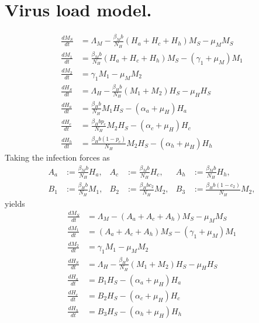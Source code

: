 \section{Virus load model.}
\begin{equation}
	\begin{aligned}
		\frac{dM_S}{dt}&= 
			\Lambda_M - \frac{\beta_Mb}{N_H}
			(H_a+H_c+H_h)M_S-\mu_MM_S
		\\
		\frac{dM_1}{dt}
			&=
			\frac{\beta_Mb}{N_H}
			(H_a + H_c + H_h) M_S 
			-
			(\gamma_1 + \mu_M) M_1
		\\
		\frac{dM_2}{dt}&=
			\gamma_1M_1-\mu_MM_2
		\\
		\frac{dH_S}{dt}&=
			\Lambda_H
			-\frac{\beta_H b}{N_H}(M_1 + M_2)H_S
			-\mu_HH_S
	\\
		\frac{dH_a}{dt}&=
			\frac{\beta_H b}{N_H} M_1 H_S
			-
			(\alpha_a + \mu_H) H_a
	\\
		\frac{dH_c}{dt}&=
			\frac{\beta_H b p_c}{N_H} M_2 H_S
			-(\alpha_c + \mu_H) H_c
	\\
		\frac{dH_h}{dt}&=
			\frac{\beta_H b(1-p_c)}{N_H}
			M_2 H_S
		-
		(\alpha_h + \mu_H) H_h
	\end{aligned}
\end{equation}
Taking the infection forces as
\begin{align*}
	A_a &:= 
		\frac{\beta_Mb}{N_H} H_a, 
	&
	A_c &:=
		\frac{\beta_Mb}{N_H}H_c ,
	&
	A_h &:=
		\frac{\beta_Mb}{N_H}H_h,
	\\
	B_1&:=
		\frac{\beta_Hb}{N_H}M_1,
	&
	B_2&:=
		\frac{\beta_Hbc_2}{N_H}M_2, 
	&
	B_3&:=
		\frac{\beta_Hb(1-c_2)}{N_H}M_2,
\end{align*}
yields
\begin{equation}
	\begin{aligned}
		\frac{dM_S}{dt}
			&= \Lambda_M 
			-(A_a + A_c + A_h) M_S 
			- \mu_M M_S
		\\
		\frac{dM_1}{dt}
			&= (A_a + A_c + A_h) M_S 
			-(\gamma_1 + \mu_M) M_1
		\\
		\frac{dM_2}{dt}
			&=\gamma_1M_1 - \mu_MM_2
		\\
		\frac{dH_S}{dt}
			&=\Lambda_H - 
			\frac{\beta_Hb}{N_H}
				(M_1 + M_2)
				H_S-\mu_HH_S
		\\
		\frac{d H_a}{dt}
			&=B_1H_S - (\alpha_a + \mu_H) H_a
		\\
		\frac{dH_c}{dt}
			&=B_2H_S
			-(\alpha_c+\mu_H) H_c
		\\
		\frac{dH_h}{dt}
			&=B_3H_S
			-(\alpha_h+\mu_H) H_h
	\end{aligned}
\end{equation}
%
%
%
